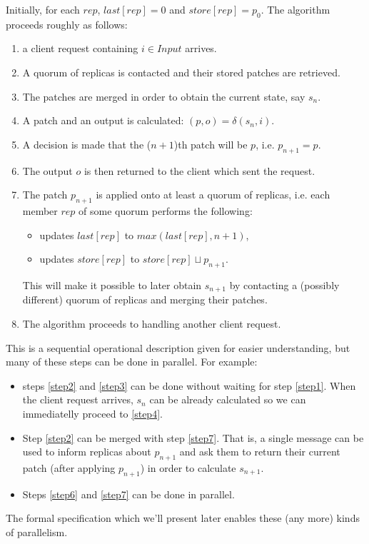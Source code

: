 \documentclass[12pt,a4paper,en]{pracamgr}
\begin{document}
Initially, for each $rep$, $last[rep] = 0$ and $store[rep] = p_0$. The algorithm proceeds roughly as follows:
\begin{enumerate}
    \item \label{step1} a client request containing $i \in Input$ arrives.
    \item \label{step2} A quorum of replicas is contacted and their stored patches are retrieved.
    \item \label{step3} The patches are merged in order to obtain the current state, say $s_n$.
    \item \label{step4} A patch and an output is calculated: $(p, o) = \delta(s_n, i)$.
    \item \label{step5} A decision is made that the ($n+1$)th patch will be $p$, i.e. $p_{n+1} = p$.
    \item \label{step6} The output $o$ is then returned to the client which sent the request.
    \item \label{step7} The patch $p_{n+1}$ is applied onto at least a quorum of replicas, i.e. each member $rep$ of some quorum performs the following:
        \begin{itemize}
            \item updates $last[rep]$ to $max(last[rep], n+1)$,
            \item updates $store[rep]$ to $store[rep] \sqcup p_{n+1}$.
        \end{itemize}
        This will make it possible to later obtain $s_{n+1}$ by contacting a (possibly different) quorum of replicas and merging their patches.
    \item The algorithm proceeds to handling another client request.
\end{enumerate}
This is a sequential operational description given for easier understanding, but many of these steps can be done in parallel. For example:
\begin{itemize}
    \item steps \ref{step2} and \ref{step3} can be done without waiting for step \ref{step1}. When the client request arrives, $s_n$ can be already calculated so we can immediatelly proceed to \ref{step4}.
    \item Step \ref{step2} can be merged with step \ref{step7}. That is, a single message can be used to inform replicas about $p_{n+1}$ and ask them to return their current patch (after applying $p_{n+1}$) in order to calculate $s_{n+1}$.
    \item Steps \ref{step6} and \ref{step7} can be done in parallel.
\end{itemize}
The formal specification which we'll present later enables these (any more) kinds of parallelism.
\end{document}
